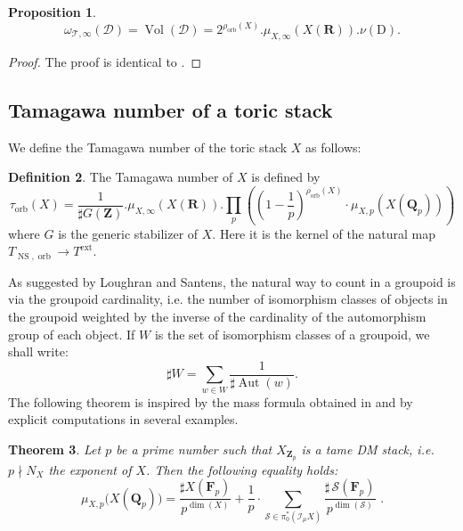 \documentclass{proc-l}
\newcommand{\R}{\mathbf{R}}
\newcommand{\Z}{\mathbf{Z}}
\newcommand{\Q}{\mathbf{Q}}
\newcommand{\F}{\mathbf{F}}
\DeclareMathOperator{\Aut}{Aut}
\DeclareMathOperator{\Vol}{Vol}
\DeclareMathOperator{\NS}{NS}
\DeclareMathOperator{\orb}{orb}
\DeclareMathOperator{\ext}{ext}
\newcommand{\stackS}{\mathcal{S}}
\newcommand{\stackT}{\mathcal{T}}
\newcommand{\sheafI}{\mathcal{I}}
\newcommand{\w}{\omega}
\newcommand{\twistsector}{\pi_0^*(\sheafI_{\mu} X)}
\newtheorem{theorem}{Theorem}[section]
\newtheorem{prop}[theorem]{Proposition}
\theoremstyle{definition}
\newtheorem{definition}[theorem]{Definition}
\theoremstyle{remark}
\numberwithin{equation}{section}
\begin{document}
\begin{prop}\label{analysis_measure_univ_torsor_at_infty}
   $$ \w_{\stackT,\infty}(\mathcal{D}) = \Vol(\mathcal{D}) = 2^{\rho_{\orb}(X)} .\mu_{X,\infty}(X(\R)) . \nu(\mathrm{D}) . $$
\end{prop}

\begin{proof}
   The proof is identical to \cite[proposition 3.29]{bongiorno2024multiheightanalysisrationalpoints}.   

\end{proof}

\subsection{Tamagawa number of a toric stack}


 
 
 
We define the Tamagawa number of the toric stack $X$ as follows:
   
\begin{definition}\label{definition_orbifold_tamagawa_number}
    The Tamagawa number of $X$ is defined by $$\tau_{\orb}(X) = \frac{1}{\sharp G(\Z)} . \mu_{X,\infty}(X(\R)). \prod\limits_p \left( \left(1 - \frac{1}{p} \right)^{\rho_{\orb}(X)} \cdot \mu_{X,p}(X(\Q_p)) \right)$$ where $G$ is the generic stabilizer of $X$. Here it is the kernel of the natural map $T_{\NS,\orb} \rightarrow T^{\ext}$.
\end{definition}

As suggested by Loughran and Santens, the natural way to count in a groupoid is via the groupoid cardinality, i.e. the number of isomorphism classes of objects in the groupoid weighted by the inverse of the cardinality of the automorphism group of each object. If $W$ is the set of isomorphism classes of a groupoid, we shall write:
\begin{equation}\label{equation_groupoid_cardinality}
\sharp W = \sum\limits_{w \in W} \frac{1}{\sharp \Aut(w)} .    
\end{equation}
The following theorem is inspired by the mass formula obtained in \cite[Corollary 8.11]{loughran_santens_malle_conjecture} and by explicit computations in several examples.

\begin{theorem}\label{theorem_interpretation_mass_formula}
Let $p$ be a prime number such that $X_{\Z_p}$ is a tame DM stack, i.e. $p \nmid N_X$ the exponent of $X$. Then the following equality holds:
\[
\mu_{X,p}\bigl(X(\Q_p)\bigr)
= \frac{\sharp X(\F_p)}{p^{\dim(X)}}  + \frac{1}{p} \cdot
\sum\limits_{\stackS \in \twistsector} 
\frac{\sharp\, \stackS\!\left(\F_p\right)}{p^{\dim(\stackS)}} \, \, .
\]
\end{theorem}
\end{document}
